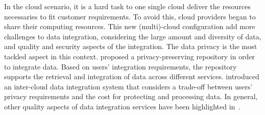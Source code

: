 \documentclass[12pt,a4paper,oneside]{report}
\begin{document}

%

In the cloud scenario, it is a hard task to one single cloud deliver the resources necessaries to fit customer requirements. 
To avoid this, cloud providers began to share their computing resources.
This new (multi)-cloud configuration add more challenges to data integration, considering the large amount and diversity of data, and quality and security aspects of the integration.
The data privacy is the most tackled aspect in this context.
\cite{YauY08} proposed a privacy-preserving repository in order to integrate data. 
Based on users' integration requirements, the repository supports the retrieval and integration of data across different services. 
\cite{096} introduced an inter-cloud data integration system that considers a trade-off between users' privacy requirements and the cost for protecting and processing data.
In general, other quality aspects of data integration services have been highlighted in~\cite{Dustdar:2012}.
\end{document}
